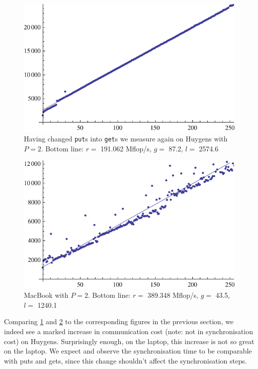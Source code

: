 \documentclass[a4paper]{article}
\begin{document}
\begin{figure}[h]
    \begin{center}
        \includegraphics{img/bench-huy-get-p2.pdf}
    \end{center}
    \caption{Having changed \texttt{put}s into \texttt{get}s we measure again on
    Huygens with $P=2$. Bottom line: $r=$ 191.062 Mflop/s, $g=$ 87.2, $l=$ 2574.6}
    \label{fig:bench-huy-get-p2}
\end{figure}

\begin{figure}[h]
    \begin{center}
        \includegraphics{img/bench-laptop-get.pdf}
    \end{center}
    \caption{MacBook with $P=2$. Bottom line: $r=$ 389.348 Mflop/s, $g=$ 43.5, $l=$ 1240.1}
    \label{fig:bench-laptop-get-p2}
\end{figure}

Comparing \ref{fig:bench-huy-get-p2} and \ref{fig:bench-laptop-get-p2} to the
corresponding figures in the previous section, we indeed see a marked increase
in communication cost (note: not in synchronisation cost) on Huygens. Surprisingly enough, on the laptop, this
increase is not so great on the laptop. We expect and observe the
synchronisation time to be comparable with puts and gets, since this change
shouldn't affect the synchronisation steps. 
\end{document}
